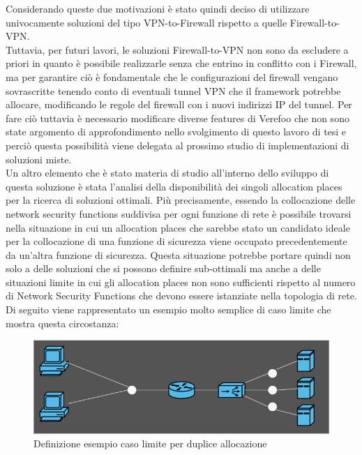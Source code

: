Considerando queste due motivazioni è stato quindi deciso di utilizzare univocamente soluzioni del tipo VPN-to-Firewall rispetto a quelle Firewall-to-VPN.\\
Tuttavia, per futuri lavori, le soluzioni Firewall-to-VPN non sono da escludere a priori in quanto è possibile realizzarle senza che entrino in conflitto con i Firewall, ma per 
garantire ciò è fondamentale che le configurazioni del firewall vengano sovrascritte tenendo conto di eventuali tunnel VPN che il framework potrebbe allocare, modificando le regole del firewall con i nuovi indirizzi IP del tunnel. Per fare ciò tuttavia è necessario modificare
diverse features di Verefoo che non sono state argomento di approfondimento nello svolgimento di questo lavoro di tesi e perciò questa possibilità viene delegata al prossimo studio di implementazioni di soluzioni miste.
\\
Un altro elemento che è stato materia di studio all'interno dello sviluppo di questa soluzione è stata l'analisi della disponibilità dei singoli allocation places per la ricerca di soluzioni ottimali.
Più precisamente, essendo la collocazione delle network security functions suddivisa per ogni funzione di rete è possibile trovarsi nella situazione in cui un allocation places che sarebbe stato un candidato ideale per la collocazione di una funzione di sicurezza viene occupato
precedentemente da un'altra funzione di sicurezza. Questa situazione potrebbe portare quindi non solo a delle soluzioni che si possono definire sub-ottimali ma anche a delle situazioni limite in cui gli allocation places non sono sufficienti rispetto al numero di Network Security Functions
che devono essere istanziate nella topologia di rete. Di seguito viene rappresentato un esempio molto semplice di caso limite che mostra questa circostanza: 

\begin{figure}[h]  %
    \centering
    \includegraphics[width=1\textwidth]{CasoLimite.png}  %
    \caption{Definizione esempio caso limite per duplice allocazione}
    \label{fig:CasoLimite1}
\end{figure}

